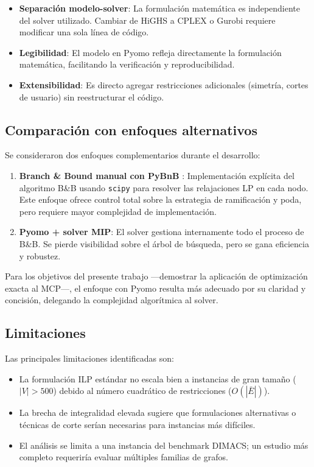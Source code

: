 \begin{itemize}
    \item \textbf{Separación modelo-solver}: La formulación matemática es independiente del solver utilizado. Cambiar de HiGHS a CPLEX o Gurobi requiere modificar una sola línea de código.
    \item \textbf{Legibilidad}: El modelo en Pyomo refleja directamente la formulación matemática, facilitando la verificación y reproducibilidad.
    \item \textbf{Extensibilidad}: Es directo agregar restricciones adicionales (simetría, cortes de usuario) sin reestructurar el código.
\end{itemize}

\subsection{Comparación con enfoques alternativos}

Se consideraron dos enfoques complementarios durante el desarrollo:

\begin{enumerate}
    \item \textbf{Branch \& Bound manual con PyBnB} \parencite{pybnb}: Implementación explícita del algoritmo B\&B usando \texttt{scipy} \parencite{scipy2020} para resolver las relajaciones LP en cada nodo. Este enfoque ofrece control total sobre la estrategia de ramificación y poda, pero requiere mayor complejidad de implementación.
    \item \textbf{Pyomo + solver MIP}: El solver gestiona internamente todo el proceso de B\&B. Se pierde visibilidad sobre el árbol de búsqueda, pero se gana eficiencia y robustez.
\end{enumerate}

Para los objetivos del presente trabajo —demostrar la aplicación de optimización exacta al MCP—, el enfoque con Pyomo resulta más adecuado por su claridad y concisión, delegando la complejidad algorítmica al solver.

\subsection{Limitaciones}

Las principales limitaciones identificadas son:

\begin{itemize}
    \item La formulación ILP estándar no escala bien a instancias de gran tamaño ($|V| > 500$) debido al número cuadrático de restricciones ($O(|\bar{E}|)$).
    \item La brecha de integralidad elevada sugiere que formulaciones alternativas o técnicas de corte serían necesarias para instancias más difíciles.
    \item El análisis se limita a una instancia del benchmark DIMACS; un estudio más completo requeriría evaluar múltiples familias de grafos.
\end{itemize}